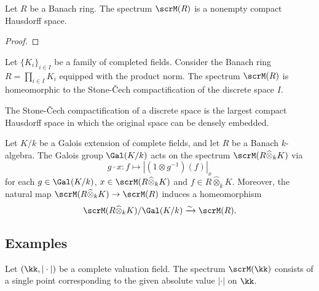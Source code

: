     \begin{theorem}\label{thm:spectrum_of_Banach_rings_is_nonempty_compact_Hausdorff}
        Let \(R\) be a Banach ring.
        The spectrum \(\scrM(R)\) is a nonempty compact Hausdorff space.
    \end{theorem}
    \begin{proof}
    \end{proof}

    \begin{lemma}\label{lem:spectrum_of_product_of_completed_fields}
        Let \(\{K_i\}_{i \in I}\) be a family of completed fields.
        Consider the Banach ring \(R = \prod_{i \in I} K_i\) equipped with the product norm.
        The spectrum \(\scrM(R)\) is homeomorphic to the Stone-\v{C}ech compactification of the discrete space \(I\).
    \end{lemma}

    \begin{remark}\label{rmk:some_fact_about_the_Stone_Cech_compactification}
        The Stone-\v{C}ech compactification of a discrete space is the largest compact Hausdorff space in which the original space can be densely embedded.
    \end{remark}

    \begin{proposition}\label{prop:the_Galois_action_on_the_spectrum_of_banach_rings}
        Let \(K/k\) be a Galois extension of complete fields, and let \(R\) be a Banach \(k\)-algebra.
        The Galois group \(\Gal(K/k)\) acts on the spectrum \(\scrM(R \widehat{\otimes}_k K)\) via
        \[
            g \cdot x: f \mapsto |(1 \otimes g^{-1})(f)|_x
        \]
        for each \(g \in \Gal(K/k)\), \(x \in \scrM(R \widehat{\otimes}_k K)\) and \(f \in R \widehat{\otimes}_k K\).
        Moreover, the natural map \(\scrM(R \widehat{\otimes}_k K) \to \scrM(R)\) induces a homeomorphism
        \[
            \scrM(R \widehat{\otimes}_k K) / \Gal(K/k) \xrightarrow{\sim} \scrM(R).
        \]
    \end{proposition}


\subsection{Examples}

    \begin{example}\label{eg:spectrum_of_valuation_field}
        Let \((\kk, |\cdot|)\) be a complete valuation field.
        The spectrum \(\scrM(\kk)\) consists of a single point corresponding to the given absolute value \(|\cdot|\) on \(\kk\).
    \end{example}

